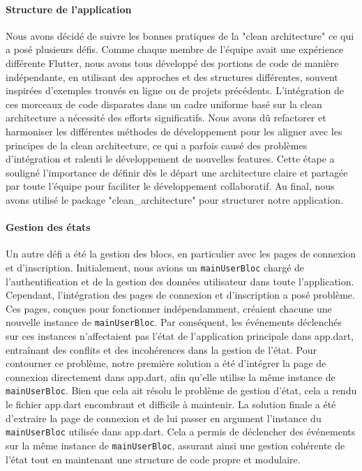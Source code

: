\paragraph{Structure de l'application} Nous avons décidé de suivre les bonnes pratiques de la "clean architecture" ce qui a posé plusieurs défis. Comme chaque membre de l'équipe avait une expérience différente Flutter, nous avons tous développé des portions de code de manière indépendante, en utilisant des approches et des structures différentes, souvent inspirées d'exemples trouvés en ligne ou de projets précédents. L'intégration de ces morceaux de code disparates dans un cadre uniforme basé sur la clean architecture a nécessité des efforts significatifs. Nous avons dû refactorer et harmoniser les différentes méthodes de développement pour les aligner avec les principes de la clean architecture, ce qui a parfois causé des problèmes d'intégration et ralenti le développement de nouvelles features. Cette étape a souligné l'importance de définir dès le départ une architecture claire et partagée par toute l'équipe pour faciliter le développement collaboratif. Au final, nous avons utilisé le package "clean\_architecture" pour structurer notre application.

\paragraph{Gestion des états} Un autre défi a été la gestion des blocs, en particulier avec les pages de connexion et d'inscription. Initialement, nous avions un \texttt{mainUserBloc} chargé de l'authentification et de la gestion des données utilisateur dans toute l'application. Cependant, l'intégration des pages de connexion et d'inscription a posé problème. Ces pages, conçues pour fonctionner indépendamment, créaient chacune une nouvelle instance de \texttt{mainUserBloc}. Par conséquent, les événements déclenchés sur ces instances n'affectaient pas l'état de l'application principale dans app.dart, entraînant des conflits et des incohérences dans la gestion de l'état. Pour contourner ce problème, notre première solution a été d'intégrer la page de connexion directement dans app.dart, afin qu'elle utilise la même instance de \texttt{mainUserBloc}. Bien que cela ait résolu le problème de gestion d'état, cela a rendu le fichier app.dart encombrant et difficile à maintenir. La solution finale a été d'extraire la page de connexion et de lui passer en argument l'instance du \texttt{mainUserBloc} utilisée dans app.dart. Cela a permis de déclencher des événements sur la même instance de \texttt{mainUserBloc}, assurant ainsi une gestion cohérente de l'état tout en maintenant une structure de code propre et modulaire.

